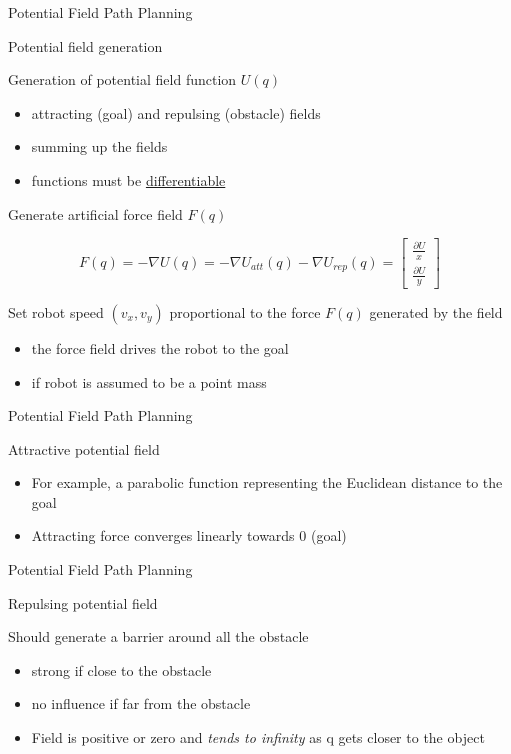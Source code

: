 \documentclass[compress]{beamer}
\begin{document}
\begin{frame}{Potential Field Path Planning}

Potential field generation

Generation of potential field function $U(q)$

\begin{itemize}
\item attracting (goal) and repulsing (obstacle) fields
\item summing up the fields
\item functions must be
  \href{http://en.wikipedia.org/wiki/Differentiable_function}{differentiable}
\end{itemize}

Generate artificial force field $F(q)$

\[
    F(q) = -\nabla U(q) = -\nabla U_{att}(q) - \nabla U_{rep}(q) =
    \begin{bmatrix}\frac{\partial U}{x} \\ \frac{\partial U}{y}\end{bmatrix}
\]

Set robot speed $(v_x, v_y)$ proportional to the force
$F(q)$ generated by the field

\begin{itemize}
\item the force field drives the robot to the goal
\item if robot is assumed to be a point mass
\end{itemize}


\end{frame}

\begin{frame}{Potential Field Path Planning}

Attractive potential field

\begin{itemize}
\item For example, a parabolic function representing the Euclidean distance
  to the goal
\item Attracting force converges linearly towards 0 (goal)
\end{itemize}

\end{frame}

\begin{frame}{Potential Field Path Planning}

Repulsing potential field

Should generate a barrier around all the obstacle

\begin{itemize}
\item strong if close to the obstacle
\item no influence if far from the obstacle
\item Field is positive or zero and \emph{tends to infinity} as q gets
  closer to the object
\end{itemize}

\end{frame}
\end{document}
